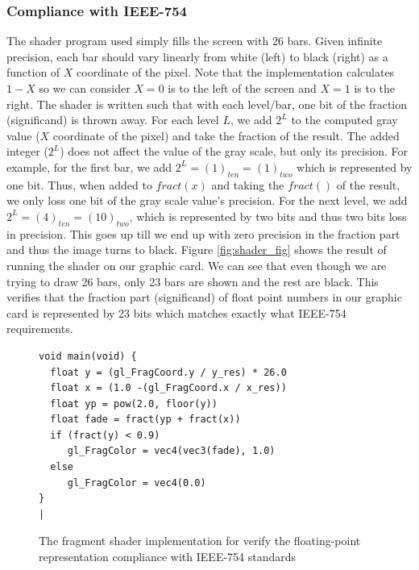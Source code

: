 \subsubsection{Compliance with IEEE-754}
The shader program used simply fills the screen with 26 bars. Given infinite precision, each bar should vary linearly from white (left) to black (right) as a function of $X$ coordinate of the pixel. Note that the implementation calculates $1-X$ so we can consider $X=0$ is to the left of the screen and $X=1$ is to the right. The shader is written such that with each level/bar, one bit of the fraction (significand) is thrown away. For each level $L$, we add $2^{L}$ to the computed gray value ($X$ coordinate of the pixel) and take the fraction of the result. The added integer ($2^{L}$) does not affect the value of the gray scale, but only its precision. For example, for the first bar, we add  $2^{L}=(1)_{ten}=(1)_{two}$ which is represented by one bit. Thus, when added to $fract(x)$ and taking the $fract()$ of the result, we only loss one bit of the gray scale value's precision. For the next level, we add $2^{L}=(4)_{ten}=(10)_{two}$, which is represented by two bits and thus two bits loss in precision. This goes up till we end up with zero precision in the fraction part and thus the image turns to black. Figure \ref{fig:shader_fig} shows the result of running the shader on our graphic card. We can see that even though we are trying to draw 26 bars, only 23 bars are shown and the rest are black. This verifies that the fraction part (significand) of float point numbers in our graphic card is represented by 23 bits which matches exactly what IEEE-754 requirements. 

\begin{figure}[t!]
\centering
\begin{minipage}[t]{\textwidth}
\centering
\begin{lstlisting}[label=list:ExampleShader,
escapechar=|,
caption={
  Fragment Shader.
}]
void main(void) {
  float y = (gl_FragCoord.y / y_res) * 26.0
  float x = (1.0 -(gl_FragCoord.x / x_res))
  float yp = pow(2.0, floor(y))
  float fade = fract(yp + fract(x))
  if (fract(y) < 0.9)
     gl_FragColor = vec4(vec3(fade), 1.0)
  else
     gl_FragColor = vec4(0.0)
}
|
\end{lstlisting}
\end{minipage}

\caption{The fragment shader implementation for verify the floating-point representation compliance with IEEE-754 standards}
\label{fig:shader_code}
\end{figure}



